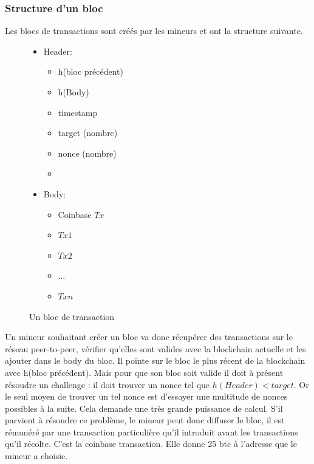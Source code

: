 \documentclass[11pt,a4paper]{article}
\begin{document}
\subsubsection{Structure d'un bloc}

Les blocs de transactions sont créés par les mineurs et ont la structure suivante.

\begin{figure}[H]
\begin{itemize}
\renewcommand{\labelitemi}{$\bullet$}
\renewcommand{\labelitemii}{$\star$}

\item Header:
\begin{itemize}
\item h(bloc précédent)
\item h(Body)
\item timestamp
\item target (nombre)
\item nonce (nombre) 
\item[ ]
\end{itemize}

\item Body:
\begin{itemize}
\item Coinbase $Tx$
\item $Tx1$
\item $Tx2$
\item $\ldots$
\item $Txn$
\end{itemize}

\end{itemize}

\caption{Un bloc de transaction}
\end{figure}

Un mineur souhaitant créer un bloc va donc récupérer des transactions sur le réseau peer-to-peer, vérifier qu'elles sont valides avec la blockchain actuelle et les ajouter dans le body du bloc. Il pointe sur le bloc le plus récent de la blockchain avec h(bloc précédent). Mais pour que son bloc soit valide il doit à présent résoudre un challenge : il doit trouver un nonce tel que $h(Header)<target$. Or le seul moyen de trouver un tel nonce est d'essayer une multitude de nonces possibles à la suite. Cela demande une très grande puissance de calcul. S'il parvient à résoudre ce problème, le mineur peut donc diffuser le bloc, il est rémunéré par une transaction particulière qu'il introduit avant les transactions qu'il récolte. C'est la coinbase transaction. Elle donne 25 btc à l'adresse que le mineur a choisie.
\end{document}
